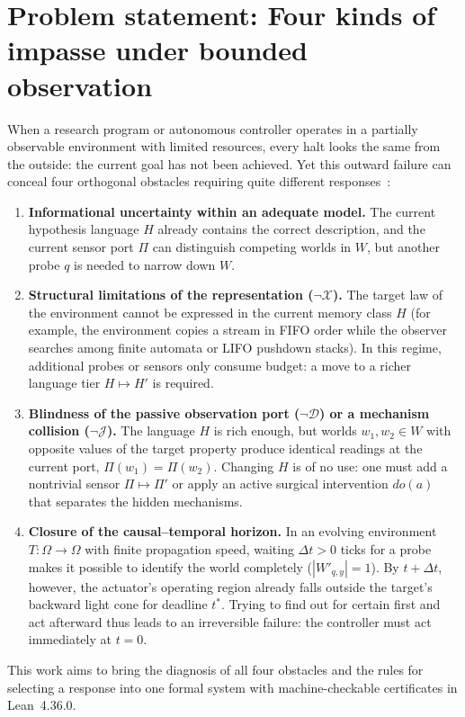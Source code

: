 \documentclass[11pt,a4paper]{article}
\theoremstyle{cleanthm}
\begin{document}
\section{Problem statement: Four kinds of impasse under bounded observation}
When a research program or autonomous controller operates in a partially observable environment with limited resources, every halt looks the same from the outside: the current goal has not been achieved. Yet this outward failure can conceal four orthogonal obstacles requiring quite different responses~\cite{reiter1987,pearl2009,wolpert2008}:
\begin{enumerate}
\item \textbf{Informational uncertainty within an adequate model.} The current hypothesis language $H$ already contains the correct description, and the current sensor port $\Pi$ can distinguish competing worlds in $W$, but another probe $q$ is needed to narrow down $W$.
\item \textbf{Structural limitations of the representation ($\neg\mathcal{X}$).} The target law of the environment cannot be expressed in the current memory class $H$ (for example, the environment copies a stream in FIFO order while the observer searches among finite automata or LIFO pushdown stacks). In this regime, additional probes or sensors only consume budget: a move to a richer language tier $H\mapsto H'$ is required.
\item \textbf{Blindness of the passive observation port ($\neg\mathcal{D}$) or a mechanism collision ($\neg\mathcal{J}$).} The language $H$ is rich enough, but worlds $w_1,w_2\in W$ with opposite values of the target property produce identical readings at the current port, $\Pi(w_1)=\Pi(w_2)$. Changing $H$ is of no use: one must add a nontrivial sensor $\Pi\mapsto\Pi'$ or apply an active surgical intervention $do(a)$ that separates the hidden mechanisms.
\item \textbf{Closure of the causal--temporal horizon.} In an evolving environment $T:\Omega\to\Omega$ with finite propagation speed, waiting $\Delta t>0$ ticks for a probe makes it possible to identify the world completely ($|W'_{q,y}|=1$). By $t+\Delta t$, however, the actuator's operating region already falls outside the target's backward light cone for deadline $t^*$. Trying to find out for certain first and act afterward thus leads to an irreversible failure: the controller must act immediately at $t=0$.
\end{enumerate}
This work aims to bring the diagnosis of all four obstacles and the rules for selecting a response into one formal system with machine-checkable certificates in Lean~4.36.0.
\end{document}
